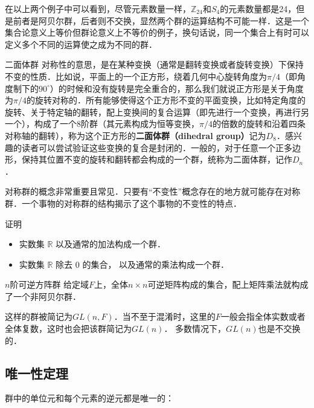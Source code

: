 在以上两个例子中可以看到，尽管元素数量一样，$\mathbb{Z}_{24}$和$S_4$的元素数量都是24，但是前者是阿贝尔群，后者则不交换，显然两个群的运算结构不可能一样．这是一个集合论意义上等价但群论意义上不等价的例子，换句话说，同一个集合上有时可以定义多个不同的运算使之成为不同的群．

\begin{example}{二面体群}\label{Group_ex4}
对称性的意思，是在某种变换（通常是翻转变换或者旋转变换）下保持不变的性质．比如说，平面上的一个正方形，绕着几何中心旋转角度为$\pi/4$（即角度制下的$90^\circ$）的时候和没有旋转是完全重合的，那么我们就说正方形是关于角度为$\pi/4$的旋转对称的．所有能够使得这个正方形不变的平面变换，比如特定角度的旋转、关于特定轴的翻转，配上变换间的复合运算（即先进行一个变换，再进行另一个），构成了一个8阶群（其元素构成为恒等变换，$\pi/4$的倍数的旋转和沿着四条对称轴的翻转），称为这个正方形的\textbf{二面体群（dihedral group）}记为$D_8$．感兴趣的读者可以尝试验证这些变换的复合是封闭的．一般的，对于任意一个正多边形，保持其位置不变的旋转和翻转都会构成的一个群，统称为二面体群，记作$D_n$．


\end{example}
对称群的概念非常重要且常见．只要有“不变性”概念存在的地方就可能存在对称群．一个事物的对称群的结构揭示了这个事物的不变性的特点．

\begin{exercise}{}
证明
\begin{itemize}
\item 实数集 $\mathbb R$ 以及通常的加法构成一个群．
\item 实数集 $\mathbb R$ 除去 $0$ 的集合， 以及通常的乘法构成一个群．
\end{itemize}
\end{exercise}

\begin{example}{$n$阶可逆方阵群}\label{Group_ex5}
给定域$F$上，全体$n\times n$可逆矩阵构成的集合，配上矩阵乘法就构成了一个非阿贝尔群．%

这样的群被简记为$GL(n, F)$．当不至于混淆时，这里的$F$一般会指全体实数或者全体复数，这时也会把该群简记为$GL(n)$． 多数情况下，$GL(n)$也是不交换的．
\end{example}

\subsection{唯一性定理}

群中的单位元和每个元素的逆元都是唯一的：

